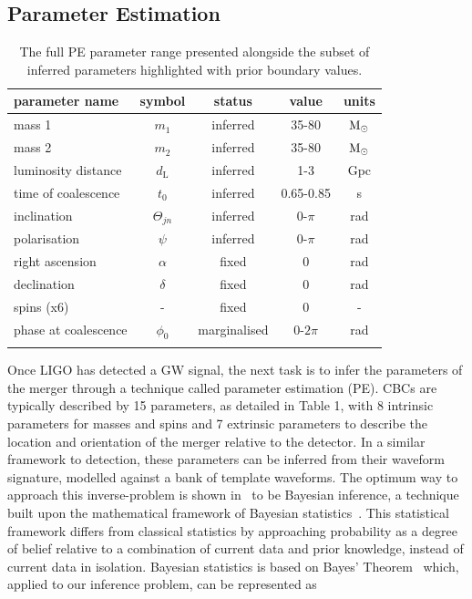 \documentclass[a4paper]{jpconf}
\begin{document}

\subsection{Parameter Estimation}\label{intro:pe}

\begin{table}[t]
	\centering
	\caption{The full \ac{PE} parameter range presented alongside the subset of inferred parameters highlighted with prior boundary values.}
	\begin{tabular}[t]{lcccc}
		\br
		parameter name & symbol & status & value & units\\
		\hline
		mass 1 & $m_1$ & inferred  & 35-80 & \(\textup{M}_\odot\)\\
		mass 2 & $m_2$ & inferred & 35-80 & \(\textup{M}_\odot\)\\
		luminosity distance & $d_{\text{L}}$ & inferred & 1-3 & Gpc\\
		time of coalescence & $t_{0}$ & inferred & 0.65-0.85 & s\\
		inclination & $\Theta_{jn}$ & inferred & 0-$\pi$ & rad\\
		polarisation & $\psi$ & inferred & 0-$\pi$ & rad\\
		\hline
		right ascension & $\alpha$ & fixed & 0 & rad\\
		declination & $\delta$ & fixed & 0 & rad\\
		spins (x6) & - & fixed & 0 & -\\
		\hline
		phase at coalescence & $\phi_{0}$ & marginalised & 0-$2\pi$ & rad\\
		\br
	\end{tabular}
	\label{tab:params}
\end{table}

Once LIGO has detected a GW signal, the next task is to infer the parameters of the merger through a technique called parameter estimation (PE). CBCs are typically described by 15 parameters, as detailed in Table 1, with 8 intrinsic parameters for masses and spins and 7 extrinsic parameters to describe the location and orientation of the merger relative to the detector. In a similar framework to detection, these parameters can be inferred from their waveform signature, modelled against a bank of template waveforms. The optimum way to approach this inverse-problem is shown in~\cite{2009CQGra..26o5017S} to be Bayesian inference, a technique built upon the mathematical framework of Bayesian statistics~\cite{bayesog}. This statistical framework differs from classical statistics by approaching probability as a degree of belief relative to a combination of current data and prior knowledge, instead of current data in isolation. Bayesian statistics is based on Bayes’ Theorem~\cite{Bayestheorem} which, applied to our inference problem, can be represented as
\end{document}
